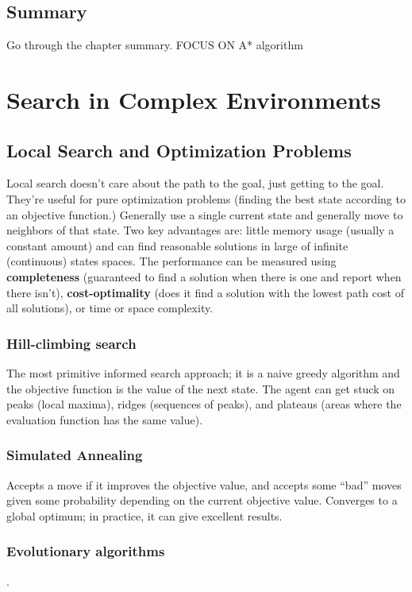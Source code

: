 \documentclass[exam={Midterm},color=true]{cs581exam}
\renewcommand{\emph}[1]{\textbf{#1}}
\begin{document}
\subsection{Summary}\label{subsec:3-summary}
Go through the chapter summary. FOCUS ON A* algorithm

\section{Search in Complex Environments}\label{sec:search-in-complex-environments}
\subsection{Local Search and Optimization Problems}\label{subsec:local-search-and-optimization-problems}
Local search doesn't care about the path to the goal, just getting to the goal.
They're useful for pure optimization problems (finding the best state according to an objective function.)
Generally use a single current state and generally move to neighbors of that state.
Two key advantages are: little memory usage (usually a constant amount) and can find reasonable solutions in large of infinite (continuous) states spaces.
The performance can be measured using \emph{completeness} (guaranteed to find a solution when there is one and report when there isn't), \emph{cost-optimality} (does it find a solution with the lowest path cost of all solutions), or time or space complexity.
%
\subsubsection{Hill-climbing search}\label{subsubsec:4.1.1}
The most primitive informed search approach; it is a naive greedy algorithm and the objective function is the value of the next state.
The agent can get stuck on peaks (local maxima), ridges (sequences of peaks), and plateaus (areas where the evaluation function has the same value).

\subsubsection{Simulated Annealing}\label{subsubsec:4.1.2}
Accepts a move if it improves the objective value, and accepts some ``bad'' moves given some probability depending on the current objective value.
Converges to a global optimum; in practice, it can give excellent results.

\setcounter{subsection}{3}%
\subsubsection{Evolutionary algorithms}\label{subsubsec:4.1.4}
.
\end{document}
